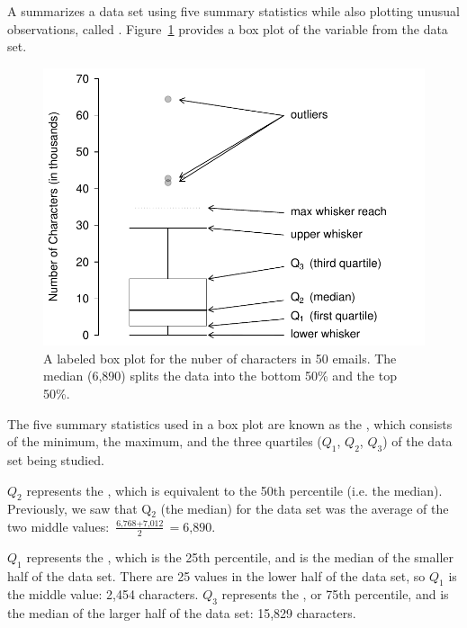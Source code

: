 A  summarizes a data set using five summary statistics while also plotting unusual observations, called . Figure~\ref{boxPlotLayoutNumVar} provides a box plot of the  variable from the  data set.

\begin{figure}
   \centering
   \includegraphics[width=0.85\mycaptionwidth]{ch_summarizing_data/figures/boxPlotLayoutNumVar/boxPlotLayoutNumVar}
\caption{A labeled box plot for the nuber of characters in 50 emails. The median (6,890) splits the data into the bottom 50\% and the top 50\%.}
   \label{boxPlotLayoutNumVar}
\end{figure}

The five summary statistics used in a box plot are known as the , which consists of the minimum, the maximum, and the three quartiles ($Q_1$, $Q_2$, $Q_3$) of the data set being studied.

$Q_2$ represents the , which is equivalent to the 50th percentile (i.e. the median). Previously, we saw that Q$_2$ (the median) for the  data set was the average of the two middle values: $\frac{\text{6,768} + \text{7,012}}{2} = \text{6,890}$.

$Q_1$ represents the , which is the 25th percentile, and is the median of the smaller half of the data set. There are 25 values in the lower half of the data set, so $Q_1$ is the middle value: 2,454 characters. $Q_3$ represents the , or 75th percentile, and is the median of the larger half of the data set: 15,829 characters.


